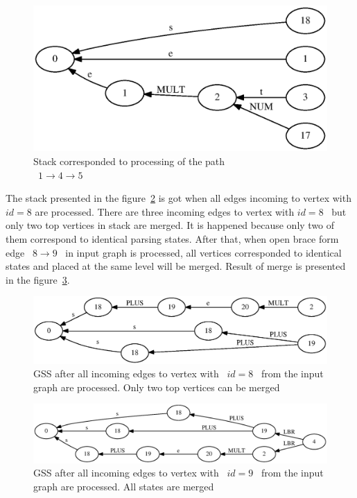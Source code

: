 \documentclass{sigplanconf}
\begin{document}
\begin{figure}[h!]
    \begin{center}
        \includegraphics[scale=0.4]{Graphs/stack_1_6.eps}
    \end{center}
    \caption{Stack corresponded to processing of the path \\ \ $1 \to 4 \to 5$}
    \label{stack4}
\end{figure}

The stack presented in the figure~\ref{stack5} is got when all edges incoming to vertex with $id=8$ are processed. There are three incoming edges to vertex with $id=8$ \ but only two top vertices in stack are merged. It is happened because only two of them correspond to identical parsing states.  After that, when open brace form edge \ $8 \to 9$ \ in input graph is processed, all vertices corresponded to identical states and placed at the same level will be merged. Result of merge is presented in the figure~\ref{stack6}.

\begin{figure}[h!]
    \begin{center}
        \includegraphics[scale=0.4]{Graphs/stack_4_9.eps}
    \end{center}
    \caption{GSS after all incoming edges to vertex with \ $id=8$ \ from the input graph are processed. Only two top vertices can be merged}
    \label{stack5}
\end{figure}

\begin{figure}[h!]
    \begin{center}
        \includegraphics[scale=0.35]{Graphs/stack_4_10.eps}
    \end{center}
    \caption{GSS after all incoming edges to vertex with \ $id=9$ \ from the input graph are processed. All states are merged}
    \label{stack6}
\end{figure}
\end{document}
